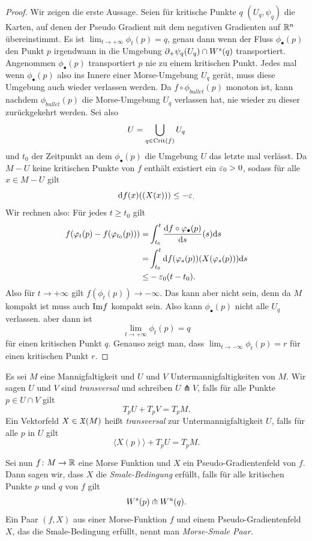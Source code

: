 \begin{proof}
    Wir zeigen die erste Aussage. Seien für kritische Punkte $q$ $(U_q, \psi_q)$ die Karten, 
    auf denen der Pseudo Gradient mit dem negativen Gradienten auf ${ \mathbb R }^n$ übereinstimmt. 
    Es ist $\lim_{t \to + \infty} \phi_t(p) = q$, genau dann wenn
    der Fluss $\phi_{\bullet}(p)$ den Punkt $p$ irgendwann in die Umgebung 
    ${ \partial }_+\psi_q(U_q) \cap { W^s }(q)$ transportiert. Angenommen $\phi_{\bullet}(p)$ transportiert
    $p$ nie zu einem kritischen Punkt. Jedes mal wenn $\phi_{\bullet}(p)$ also ins Innere einer
    Morse-Umgebung $U_q$ gerät, muss diese Umgebung auch wieder verlassen werden. Da 
    $f \circ \phi_{bullet}(p)$ monoton ist, kann nachdem $\phi_{bullet}(p)$ die Morse-Umgebung $U_q$
    verlassen hat, nie wieder zu dieser zurückgekehrt werden.
    Sei also 
    \[ U = \bigcup_{q \in { \operatorname{Crit} }(f)} U_q \]
    und $t_0$ der Zeitpunkt an dem $\phi_{\bullet} (p)$ die Umgebung $U$ das letzte mal verlässt.
    Da $M - U$ keine kritischen Punkte von $f$ enthält existiert ein $\varepsilon_0 > 0$, sodass für alle 
    $x \in M - U$ gilt 
    \[ { \operatorname{d} } f (x) ((X(x))) \leq - \varepsilon_ . \]
    Wir rechnen also: Für jedes $t \geq t_0$ gilt
    \begin{align*}
        f(\varphi_t(p) - f(\varphi_{t_0}(p))) = & 
            \int_{t_0}^t \derive[f \circ \phi_{\bullet}(p)]{s} (s) \opd s \\
        = & \int_{t_0}^t \opd f (\phi_s(p)) (X(\phi_s(p))) \opd s \\
        \leq & - \eps_0 (t - t_0) . 
    \end{align*}
    Also für $t \to + \infty$ gilt $f(\phi_t(p)) \to - \infty$. Das kann aber nicht sein, denn da 
    $M$ kompakt ist muss auch ${ \operatorname{Im} } f$ kompakt sein. Also kann $\phi_{\bullet}(p)$ nicht alle 
    $U_q$ verlassen. aber dann ist 
    \[ \lim_{t \to + \infty} \phi_t(p) = q \]
    für einen kritischen Punkt $q$.
    Genauso zeigt man, dass $\lim_{t \to - \infty} \phi_t(p) = r$ für einen kritischen Punkt $r$.
\end{proof}

\begin{definition}
    \label{def: smale-bedingung}
    Es sei $M$ eine Mannigfaltigkeit und $U$ und $V$ Untermannigfaltigkeiten von $M$. Wir sagen 
    $U$ und $V$ sind \textit{transversal} und schreiben $U \pitchfork V$, falls für alle Punkte 
    $p \in U \cap V$ gilt 
    \[ T_pU + T_pV = T_pM . \]
    Ein Vektorfeld $X \in { \mathfrak{X} } (M)$ heißt \textit{transversal} zur Untermannigfaltigkeit $U$, falls 
    für alle $p$ in $U$ gilt 
    \[ \langle X(p) \rangle + T_pU = T_pM . \]

    Sei nun $f \colon M \to { \mathbb R }$ eine Morse Funktion und $X$ ein Pseudo-Gradientenfeld von $f$. Dann sagen
    wir, dass $X$ die \textit{Smale-Bedingung} erfüllt, falls für alle kritischen Punkte $p$ und $q$ von 
    $f$ gilt 
    \[ { W^s } (p) \pitchfork { W^u } (q) . \]
    Ein Paar $(f, X)$ aus einer Morse-Funktion $f$ und einem Pseudo-Gradientenfeld $X$, das die 
    Smale-Bedingung erfüllt, nennt man \textit{Morse-Smale Paar}.
\end{definition}

